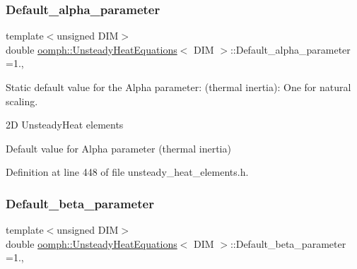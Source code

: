 \mbox{\label{classoomph_1_1UnsteadyHeatEquations_ad2647a621a4cb3f4a8301a56badd1e4e}} 
\subsubsection{\texorpdfstring{Default\+\_\+alpha\+\_\+parameter}{Default\_alpha\_parameter}}
{\footnotesize\ttfamily template$<$unsigned D\+IM$>$ \\
double \hyperlink{classoomph_1_1UnsteadyHeatEquations}{oomph\+::\+Unsteady\+Heat\+Equations}$<$ D\+IM $>$\+::Default\+\_\+alpha\+\_\+parameter =1.\hspace{0.3cm}{\ttfamily [static]}, {\ttfamily [private]}}



Static default value for the Alpha parameter\+: (thermal inertia)\+: One for natural scaling. 

2D Unsteady\+Heat elements

Default value for Alpha parameter (thermal inertia) 

Definition at line 448 of file unsteady\+\_\+heat\+\_\+elements.\+h.

\mbox{\label{classoomph_1_1UnsteadyHeatEquations_a85ec71a0ce9a5b85ce30b0aab0495ee4}} 
\subsubsection{\texorpdfstring{Default\+\_\+beta\+\_\+parameter}{Default\_beta\_parameter}}
{\footnotesize\ttfamily template$<$unsigned D\+IM$>$ \\
double \hyperlink{classoomph_1_1UnsteadyHeatEquations}{oomph\+::\+Unsteady\+Heat\+Equations}$<$ D\+IM $>$\+::Default\+\_\+beta\+\_\+parameter =1.\hspace{0.3cm}{\ttfamily [static]}, {\ttfamily [private]}}



